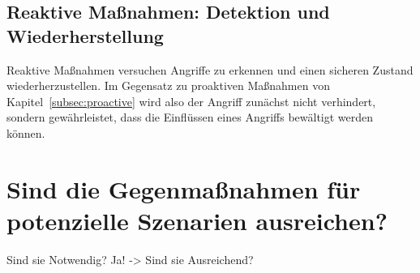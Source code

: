 \documentclass[final,bibliography=totocnumbered]{include/sikseminar}
\begin{document}



\subsection{Reaktive Maßnahmen: Detektion und Wiederherstellung}\label{subsec:reactive}

Reaktive Maßnahmen versuchen Angriffe zu erkennen und einen sicheren Zustand wiederherzustellen.
Im Gegensatz zu proaktiven Maßnahmen von Kapitel~\ref{subsec:proactive} wird also der Angriff zunächst nicht verhindert, sondern gewährleistet, dass die Einflüssen eines Angriffs bewältigt werden können.


\section{Sind die Gegenmaßnahmen für potenzielle Szenarien ausreichen?}\label{sec:diskussion}

Sind sie Notwendig?
Ja! -> Sind sie Ausreichend?


\newpage

\printbibliography
\newpage
\end{document}
